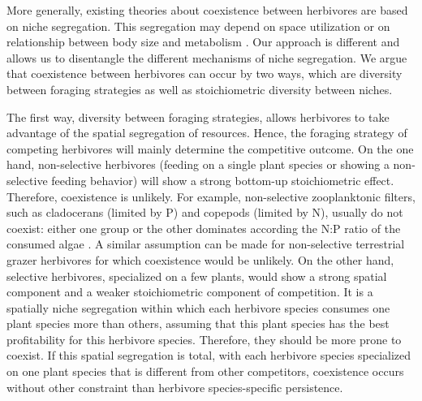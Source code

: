 \documentclass[12pt]{article}
\begin{document}
More generally, existing theories about coexistence between herbivores are based on niche segregation. This segregation may depend on space utilization or on relationship between body size and metabolism \citep{Owen-Smith1982}. Our approach is different and allows us to disentangle the different mechanisms of niche segregation. We argue that coexistence between herbivores can occur by two ways, which are  diversity between foraging strategies as well as stoichiometric diversity between niches. 
\par
The first way, diversity between foraging strategies, allows herbivores to take advantage of the spatial segregation of resources. Hence, the foraging strategy of competing herbivores will mainly determine the competitive outcome. On the one hand, non-selective herbivores (feeding on a single plant species or showing a non-selective feeding behavior) will show a strong bottom-up stoichiometric effect. Therefore, coexistence is unlikely. For example, non-selective zooplanktonic filters, such as cladocerans (limited by P) and copepods (limited by N), usually do not coexist: either one group or the other dominates according the N:P ratio of the consumed algae \citep{Andersen1991, Hessen1992, Sterner1992, Elser1996, Koski1999}. A similar assumption can be made for non-selective terrestrial grazer herbivores \citep{Albon1992} for which coexistence would be unlikely. On the other hand, selective herbivores, specialized on a few plants, would show a strong spatial component and a weaker stoichiometric component of competition. It is a spatially niche segregation within which each herbivore species consumes one plant species more than others, assuming that this plant species has the best profitability for this herbivore species. Therefore, they should be more prone to coexist. If this spatial segregation is total, with each herbivore species specialized on one plant species that is different from other competitors, coexistence occurs without other constraint than herbivore species-specific persistence. 
\end{document}
